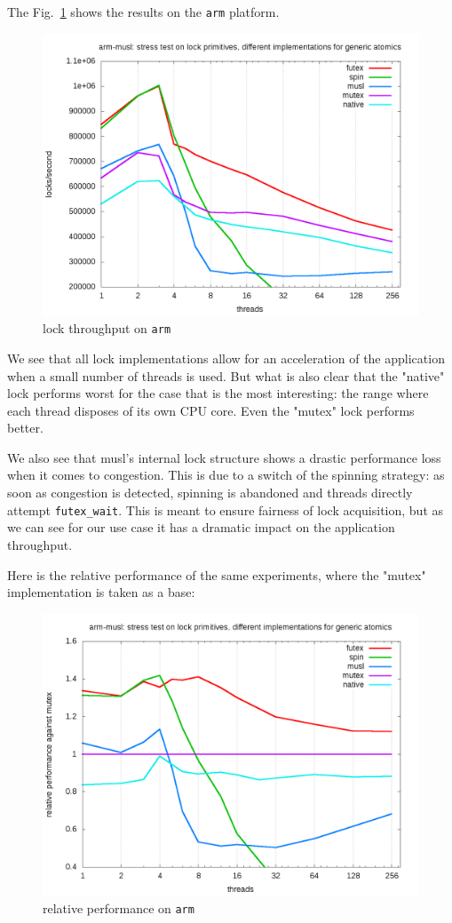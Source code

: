 The Fig.~\ref{fig:arm} shows the results on the \texttt{arm}
platform.
\begin{figure}
\includegraphics[width=0.95\linewidth]{benchs/arm/test-arm-u64.png}
\caption{lock throughput on \texttt{arm}}
\label{fig:arm}
\end{figure}
We see that all lock implementations allow for an acceleration of
the application when a small number of threads is used. But what is
also clear that the "native" lock performs worst for the case that
is the most interesting: the range where each thread disposes of
its own CPU core. Even the "mutex" lock performs better.

We also see that musl's internal lock structure shows a drastic
performance loss when it comes to congestion. This is due to a
switch of the spinning strategy: as soon as congestion is detected,
spinning is abandoned and threads directly attempt
\texttt{futex\_wait}. This is meant to ensure fairness of lock acquisition,
but as we can see for our use case it has a dramatic impact on the
application throughput.

Here is the relative performance of the same experiments, where the
"mutex" implementation is taken as a base:
\begin{figure}
\includegraphics[width=0.95\linewidth]{benchs/arm/test-arm-u64-relative.png}
\caption{relative performance on \texttt{arm}}
\label{fig:arm-rel}
\end{figure}

